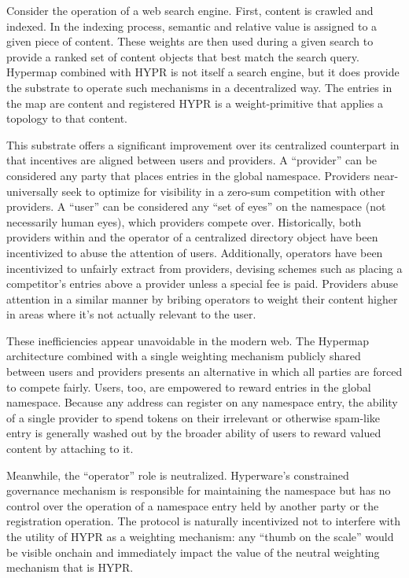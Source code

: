 \documentclass[runningheads]{llncs}
\begin{document}
Consider the operation of a web search engine.
First, content is crawled and indexed.
In the indexing process, semantic and relative value is assigned to a given piece of content.
These weights are then used during a given search to provide a ranked set of content objects that best match the search query.
Hypermap combined with HYPR is not itself a search engine, but it does provide the substrate to operate such mechanisms in a decentralized way.
The entries in the map are content and registered HYPR is a weight-primitive that applies a topology to that content.

This substrate offers a significant improvement over its centralized counterpart in that incentives are aligned between users and providers.
A ``provider'' can be considered any party that places entries in the global namespace.
Providers near-universally seek to optimize for visibility in a zero-sum competition with other providers.
A ``user'' can be considered any ``set of eyes'' on the namespace (not necessarily human eyes), which providers compete over.
Historically, both providers within and the operator of a centralized directory object have been incentivized to abuse the attention of users.
Additionally, operators have been incentivized to unfairly extract from providers, devising schemes such as placing a competitor's entries above a provider unless a special fee is paid.
Providers abuse attention in a similar manner by bribing operators to weight their content higher in areas where it's not actually relevant to the user.

These inefficiencies appear unavoidable in the modern web.
The Hypermap architecture combined with a single weighting mechanism publicly shared between users and providers presents an alternative in which all parties are forced to compete fairly.
Users, too, are empowered to reward entries in the global namespace.
Because any address can register on any namespace entry, the ability of a single provider to spend tokens on their irrelevant or otherwise spam-like entry is generally washed out by the broader ability of users to reward valued content by attaching to it.

Meanwhile, the ``operator'' role is neutralized.
Hyperware's constrained governance mechanism is responsible for maintaining the namespace but has no control over the operation of a namespace entry held by another party or the registration operation.
The protocol is naturally incentivized not to interfere with the utility of HYPR as a weighting mechanism:
any ``thumb on the scale'' would be visible onchain and immediately impact the value of the neutral weighting mechanism that is HYPR.
\end{document}
